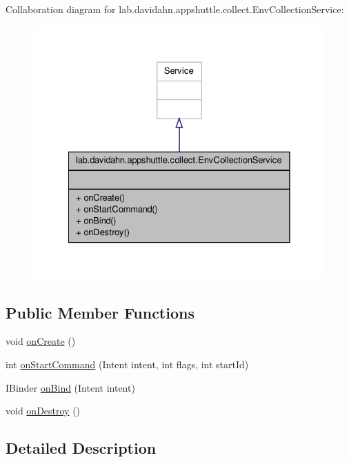 \-Collaboration diagram for lab.\-davidahn.\-appshuttle.\-collect.\-Env\-Collection\-Service\-:
\nopagebreak
\begin{figure}[H]
\begin{center}
\leavevmode
\includegraphics[width=328pt]{classlab_1_1davidahn_1_1appshuttle_1_1collect_1_1_env_collection_service__coll__graph}
\end{center}
\end{figure}
\subsection*{\-Public \-Member \-Functions}
\begin{DoxyCompactItemize}
\item 
void \hyperlink{classlab_1_1davidahn_1_1appshuttle_1_1collect_1_1_env_collection_service_a9cdadabb50ec47b1cfaeebe4edc479f7}{on\-Create} ()
\item 
int \hyperlink{classlab_1_1davidahn_1_1appshuttle_1_1collect_1_1_env_collection_service_a6e8fea8a64acc7f426572ea82988d995}{on\-Start\-Command} (\-Intent intent, int flags, int start\-Id)
\item 
\-I\-Binder \hyperlink{classlab_1_1davidahn_1_1appshuttle_1_1collect_1_1_env_collection_service_ad53a290eb5e789a2dbc362696ce567ee}{on\-Bind} (\-Intent intent)
\item 
void \hyperlink{classlab_1_1davidahn_1_1appshuttle_1_1collect_1_1_env_collection_service_a7b05d213e0f7a44bdb3069508ea8f690}{on\-Destroy} ()
\end{DoxyCompactItemize}


\subsection{\-Detailed \-Description}


